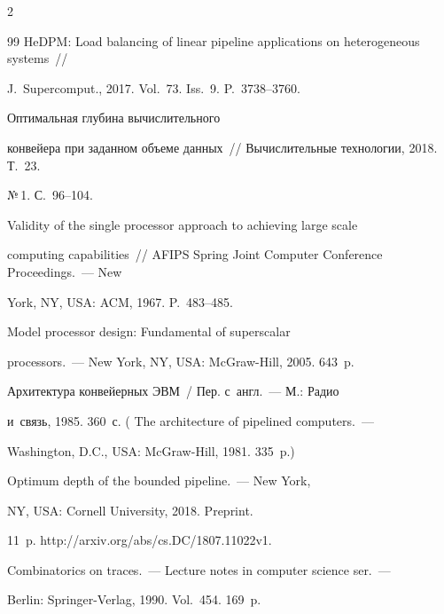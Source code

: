\begin{multicols}{2}
{{\begin{thebibliography}{99}
HeDPM: Load balancing of linear pipeline applications on heterogeneous systems~// 


J.~Supercomput., 2017. Vol.~73. Iss.~9. P.~3738--3760.




 Оптимальная глубина вычислительного 


конвейера при заданном объеме данных~// Вычислительные технологии, 2018. Т.~23. 


№\,1. С.~96--104.




 Validity of the single processor approach to achieving large scale 


computing capabilities~// AFIPS Spring Joint Computer Conference Proceedings.~--- New 


York, NY, USA: ACM, 1967. P.~483--485.




 Model processor design: Fundamental of superscalar 


processors.~--- New York, NY, USA: McGraw-Hill, 2005. 643~p.




 Архитектура конвейерных ЭВМ~/ Пер. с~англ.~--- М.: Радио 


и~связь, 1985. 360~с. ( The architecture of pipelined computers.~--- 


Washington, D.C., USA: McGraw-Hill, 1981. 335~p.)




 Optimum depth of the bounded pipeline.~--- New York, 


NY, USA: Cornell University, 2018.  Preprint.


11~p. {\sf http://arxiv.org/abs/cs.DC/1807.11022v1}.




 Combinatorics on traces.~--- Lecture notes in computer science ser.~--- 


Berlin: Springer-Verlag, 1990. Vol.~454. 169~p.


 \end{thebibliography}





 }


 }





\end{multicols}





